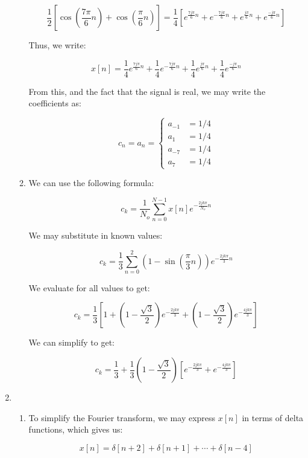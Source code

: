 \begin{enumerate}
\begin{enumerate}
        $$\frac{1}{2}\left[ \cos\left( \frac{7\pi}{6}n \right)+\cos\left( \frac{\pi}{6}n \right) \right]=\frac{1}{4}\left[ e^{\frac{7j\pi}{6}n}+e^{-\frac{7j\pi}{6}n}+e^{\frac{j\pi}{6}n}+e^{\frac{-j\pi}{6}n} \right]$$

        Thus, we write:

        $$x[n]=\frac{1}{4}e^{\frac{7j\pi}{6}n}+\frac{1}{4}e^{-\frac{7j\pi}{6}n}+\frac{1}{4}e^{\frac{j\pi}{6}n}+\frac{1}{4}e^{\frac{-j\pi}{6}n}$$

        From this, and the fact that the signal is real, we may write the coefficients as:

        $$\boxed{c_n=a_n=\left\{\begin{array}{ll} a_{-1}&= 1/4\\a_{1}&= 1/4\\a_{-7}&=1/4\\a_{7}&= 1/4\end{array}} $$

      \item We can use the following formula:

        $$c_k=\frac{1}{N_o}\sum_{n=0}^{N-1}x[n]e^{-\frac{2jk\pi}{N_o}n}$$

        We may substitute in known values:

        $$c_k=\frac{1}{3}\sum_{n=0}^{2}\left( 1-\sin\left( \frac{\pi}{3}n \right) \right)e^{-\frac{2jk\pi}{3}n}$$

        We evaluate for all values to get:

        $$c_k=\frac{1}{3}\left[1+\left( 1-\frac{\sqrt{3}}{2} \right)e^{-\frac{2jk\pi}{3}}+\left( 1-\frac{\sqrt{3}}{2} \right)e^{-\frac{4jk\pi}{3}}\right]$$

        We can simplify to get:

        $$\boxed{c_k=\frac{1}{3}+\frac{1}{3}\left( 1-\frac{\sqrt{3}}{2} \right)\left[e^{-\frac{2jk\pi}{3}}+e^{-\frac{4jk\pi}{3}}\right]}$$

    \end{enumerate}

  \item

    \begin{enumerate}

      \item To simplify the Fourier transform, we may express $x[n]$ in terms of delta functions, which gives us:

        $$x[n]=\delta[n+2]+\delta[n+1]+\cdots+\delta[n-4]$$


\end{enumerate}
\end{enumerate}
